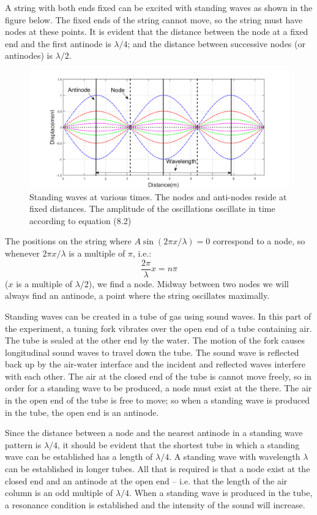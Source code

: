 A string with both ends fixed can be excited with standing waves as shown in the figure below. The fixed ends of the string cannot move, so the string must have nodes at these points. It is evident that the distance between the node at a fixed end and the first antinode is $\lambda /4$; and the distance between successive nodes (or antinodes) is $\lambda /2$.\myskip
\begin{figure}[h]
\centering
\includegraphics[width=1.0\textwidth]{./Exp8/pic/page04.png}
\caption{Standing waves at various times. The nodes and anti-nodes reside at fixed distances. The amplitude of the oscillations oscillate in time according to equation (8.2)}
\end{figure} 

 The positions on the string where $A\sin(2\pi x/\lambda) = 0$ correspond to a node, so whenever $2\pi x/\lambda$ is a multiple of $\pi$, i.e.:
 \begin{equation}
   \frac{2\pi}{\lambda}x=n\pi
 \end{equation}
($x$ is a multiple of $\lambda$/2), we find a node. Midway between two nodes we will always find an antinode, a point where the string oscillates maximally. 

Standing waves can be created in a tube of gas using sound waves. In this part of the experiment, a tuning fork vibrates over the open end of a tube containing air. The tube is sealed at the other end by the water. The motion of the fork causes longitudinal sound waves to travel down the tube. The sound wave is reflected back up by the air-water interface and the incident and reflected waves interfere with each other. The air at the closed end of the tube is cannot move freely, so in order for a standing wave to be produced, a node must exist at the there. The air in the open end of the tube is free to move; so when a standing wave is produced in the tube, the open end is an antinode.\myskip

Since the distance between a node and the nearest antinode in a standing wave pattern is $\lambda/4$, it should be evident that the shortest tube in which a standing wave can be established has a length of $\lambda/4$. A standing wave with wavelength $\lambda$ can be established in longer tubes. All that is required is that a node exist at the closed end and an antinode at the open end -- i.e. that the length of the air column is an odd multiple of $\lambda/4$. When a standing wave is produced in the tube, a resonance condition is established and the intensity of the sound will increase.

